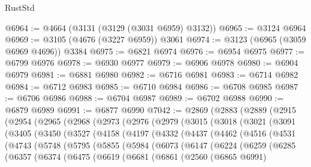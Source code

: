 \begin{lexlean}{RustStd}
\begin{coremodule}
@6964 := @4664 (@3131 (@3129 (@3031 @6959) @3132))
@6965 := @3124 @6964
@6969 := @3105 (@4676 (@3227 @6959)) @3061
@6974 := @3123 (@6965 (@3059 @6969 @4696)) @3384
@6975 := @6821 @6974
@6976 := @6954 @6975
@6977 := @6799 @6976
@6978 := @6930 @6977
@6979 := @6906 @6978
@6980 := @6904 @6979
@6981 := @6881 @6980
@6982 := @6716 @6981
@6983 := @6714 @6982
@6984 := @6712 @6983
@6985 := @6710 @6984
@6986 := @6708 @6985
@6987 := @6706 @6986
@6988 := @6704 @6987
@6989 := @6702 @6988
@6990 := @6879 @6989
@6991 := @6877 @6990
@7042 := @2869
    (@2883
      (@2889
        (@2915
          (@2954
            (@2965
              (@2968
                (@2973
                  (@2976
                    (@2979
                      (@3015
                        (@3018
                          (@3021
                            (@3091
                              (@3405
                                (@3450
                                  (@3527
                                    (@4158
                                      (@4197
                                        (@4332
                                          (@4437
                                            (@4462
                                              (@4516
                                                (@4531
                                                  (@4743
                                                    (@5748
                                                      (@5795
                                                        (@5855
                                                          (@5984
                                                            (@6073
                                                              (@6147
                                                                (@6224
                                                                  (@6259
                                                                    (@6285
                                                                      (@6357
                                                                        (@6374
                                                                          (@6475
                                                                            (@6619
                                                                              (@6681
                                                                                (@6861
                                                                                  (@2560
                                                                                    (@6865 @6991)

\end{coremodule}
\end{lexlean}
